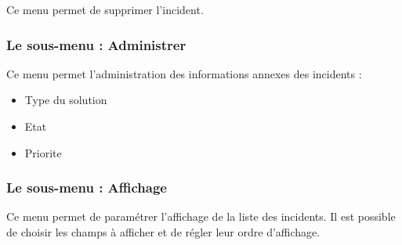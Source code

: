 Ce menu permet de supprimer l'incident.


\subsubsection{Le sous-menu : Administrer}

Ce menu permet l'administration des informations annexes des incidents :\\

\begin{itemize}
\item Type du solution
\item Etat 
\item Priorite
\end{itemize}


\subsubsection{Le sous-menu : Affichage}

Ce menu permet de paramétrer l'affichage de la liste des incidents. Il est possible de choisir les champs à afficher et de régler leur ordre d'affichage.
